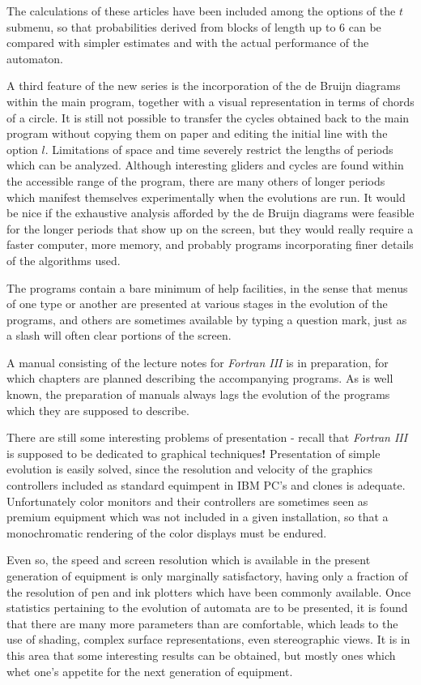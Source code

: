 The calculations of these articles have been included among the options 
of the $t$ submenu, so that probabilities derived from blocks of length 
up to 6 can be compared with simpler estimates and with the actual 
performance of the automaton.

A third feature of the new series is the incorporation of the de Bruijn 
diagrams within the main program, together with a visual representation 
in terms of chords of a circle. It is still not possible to transfer 
the cycles obtained back to the main program without copying them on 
paper and editing the initial line with the option $l$. Limitations of 
space and time severely restrict the lengths of periods which can be 
analyzed. Although interesting gliders and cycles are found within the 
accessible range of the program, there are many others of longer 
periods which manifest themselves experimentally when the evolutions 
are run. It would be nice if the exhaustive analysis afforded by the 
de Bruijn diagrams were feasible for the longer periods that show up on 
the screen, but they would really require a faster computer, more 
memory, and probably programs incorporating finer details of the 
algorithms used. 

The programs contain a bare minimum of help facilities, in the sense 
that menus of one type or another are presented at various stages in 
the evolution of the programs, and others are sometimes available by 
typing a question mark, just as a slash will often clear portions of 
the screen. 

A manual consisting of the lecture notes for {\em Fortran III} is in 
preparation, for which chapters are planned describing the accompanying 
programs. As is well known, the preparation of manuals always lags the 
evolution of the programs which they are supposed to describe.

There are still some interesting problems of presentation - recall that 
{\em Fortran III} is supposed to be dedicated to graphical techniques{\bf !} 
Presentation of simple evolution is easily solved, since the resolution 
and velocity of the graphics controllers included as standard equimpent 
in IBM PC's and clones is adequate. Unfortunately color monitors and 
their controllers are sometimes seen as premium equipment which was not 
included in a given installation, so that a monochromatic rendering of 
the color displays must be endured.

Even so, the speed and screen resolution which is available in the 
present generation of equipment is only marginally satisfactory, having 
only a fraction of the resolution of pen and ink plotters which have 
been commonly available. Once statistics pertaining to the evolution of 
automata are to be presented, it is found that there are many more 
parameters than are comfortable, which leads to the use of shading, 
complex surface representations, even stereographic views. It is in 
this area that some interesting results can be obtained, but mostly 
ones which whet one's appetite for the next generation of equipment.

